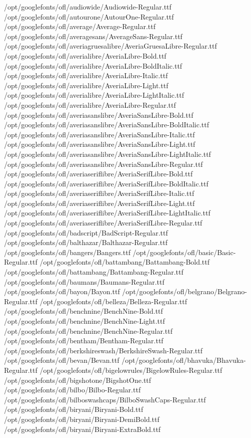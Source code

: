 /opt/googlefonts/ofl/audiowide/Audiowide-Regular.ttf
/opt/googlefonts/ofl/autourone/AutourOne-Regular.ttf
/opt/googlefonts/ofl/average/Average-Regular.ttf
/opt/googlefonts/ofl/averagesans/AverageSans-Regular.ttf
/opt/googlefonts/ofl/averiagruesalibre/AveriaGruesaLibre-Regular.ttf
/opt/googlefonts/ofl/averialibre/AveriaLibre-Bold.ttf
/opt/googlefonts/ofl/averialibre/AveriaLibre-BoldItalic.ttf
/opt/googlefonts/ofl/averialibre/AveriaLibre-Italic.ttf
/opt/googlefonts/ofl/averialibre/AveriaLibre-Light.ttf
/opt/googlefonts/ofl/averialibre/AveriaLibre-LightItalic.ttf
/opt/googlefonts/ofl/averialibre/AveriaLibre-Regular.ttf
/opt/googlefonts/ofl/averiasanslibre/AveriaSansLibre-Bold.ttf
/opt/googlefonts/ofl/averiasanslibre/AveriaSansLibre-BoldItalic.ttf
/opt/googlefonts/ofl/averiasanslibre/AveriaSansLibre-Italic.ttf
/opt/googlefonts/ofl/averiasanslibre/AveriaSansLibre-Light.ttf
/opt/googlefonts/ofl/averiasanslibre/AveriaSansLibre-LightItalic.ttf
/opt/googlefonts/ofl/averiasanslibre/AveriaSansLibre-Regular.ttf
/opt/googlefonts/ofl/averiaseriflibre/AveriaSerifLibre-Bold.ttf
/opt/googlefonts/ofl/averiaseriflibre/AveriaSerifLibre-BoldItalic.ttf
/opt/googlefonts/ofl/averiaseriflibre/AveriaSerifLibre-Italic.ttf
/opt/googlefonts/ofl/averiaseriflibre/AveriaSerifLibre-Light.ttf
/opt/googlefonts/ofl/averiaseriflibre/AveriaSerifLibre-LightItalic.ttf
/opt/googlefonts/ofl/averiaseriflibre/AveriaSerifLibre-Regular.ttf
/opt/googlefonts/ofl/badscript/BadScript-Regular.ttf
/opt/googlefonts/ofl/balthazar/Balthazar-Regular.ttf
/opt/googlefonts/ofl/bangers/Bangers.ttf
/opt/googlefonts/ofl/basic/Basic-Regular.ttf
/opt/googlefonts/ofl/battambang/Battambang-Bold.ttf
/opt/googlefonts/ofl/battambang/Battambang-Regular.ttf
/opt/googlefonts/ofl/baumans/Baumans-Regular.ttf
/opt/googlefonts/ofl/bayon/Bayon.ttf
/opt/googlefonts/ofl/belgrano/Belgrano-Regular.ttf
/opt/googlefonts/ofl/belleza/Belleza-Regular.ttf
/opt/googlefonts/ofl/benchnine/BenchNine-Bold.ttf
/opt/googlefonts/ofl/benchnine/BenchNine-Light.ttf
/opt/googlefonts/ofl/benchnine/BenchNine-Regular.ttf
/opt/googlefonts/ofl/bentham/Bentham-Regular.ttf
/opt/googlefonts/ofl/berkshireswash/BerkshireSwash-Regular.ttf
/opt/googlefonts/ofl/bevan/Bevan.ttf
/opt/googlefonts/ofl/bhavuka/Bhavuka-Regular.ttf
/opt/googlefonts/ofl/bigelowrules/BigelowRules-Regular.ttf
/opt/googlefonts/ofl/bigshotone/BigshotOne.ttf
/opt/googlefonts/ofl/bilbo/Bilbo-Regular.ttf
/opt/googlefonts/ofl/bilboswashcaps/BilboSwashCaps-Regular.ttf
/opt/googlefonts/ofl/biryani/Biryani-Bold.ttf
/opt/googlefonts/ofl/biryani/Biryani-DemiBold.ttf
/opt/googlefonts/ofl/biryani/Biryani-ExtraBold.ttf
